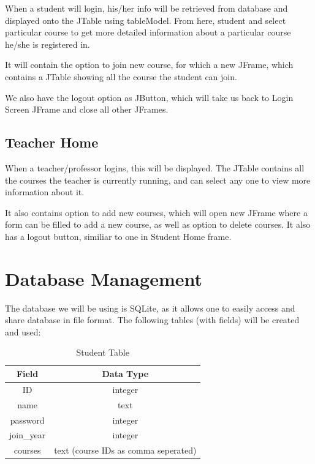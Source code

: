 \documentclass[12pt, a4paper]{article}
\begin{document}
When a student will login, his/her info will be retrieved from database and displayed onto the JTable using tableModel. From here, student and select particular course to get more detailed information about a particular course he/she is registered in.

It will contain the option to join new course, for which a new JFrame, which contains a JTable showing all the course the student can join.

We also have the logout option as JButton, which will take us back to Login Screen JFrame and close all other JFrames.

\subsection{Teacher Home}

When a teacher/professor logins, this will be displayed. The JTable contains all the courses the teacher is currently running, and can select any one to view more information about it.

It also contains option to add new courses, which will open new JFrame where a form can be filled to add a new course, as well as option to delete courses. It also has a logout button, similiar to one in Student Home frame.

\section{Database Management}

The database we will be using is SQLite, as it allows one to easily access and share database in file format. The following tables (with fields) will be created and used:

\newpage

\begin{table}[h]
	\centering
	\label{tab:student}
	\begin{tabular}{ c|c }
		\textbf{Field}	& \textbf{Data Type} \\
		\hline
		ID				& integer \\
		name 			& text \\
		password		& integer \\
		join\_year		& integer \\
		courses			& text (course IDs as comma seperated)
	\end{tabular}
	\caption{Student Table}
\end{table}
\vspace*{2.5cm}
\end{document}
